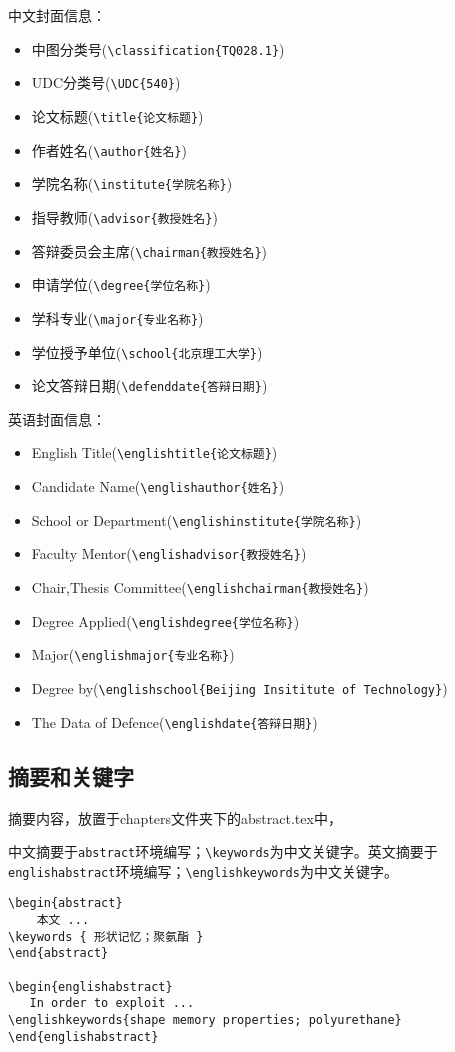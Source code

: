 中文封面信息：
\begin{itemize}
\item 中图分类号(\verb|\classification{TQ028.1}|)
\item UDC分类号(\verb|\UDC{540}|)
\item 论文标题(\verb|\title{论文标题}|)
\item 作者姓名(\verb|\author{姓名}|)
\item 学院名称(\verb|\institute{学院名称}|)
\item 指导教师(\verb|\advisor{教授姓名}|)
\item 答辩委员会主席(\verb|\chairman{教授姓名}|)
\item 申请学位(\verb|\degree{学位名称}|)
\item 学科专业(\verb|\major{专业名称}|)
\item 学位授予单位(\verb|\school{北京理工大学}|)
\item 论文答辩日期(\verb|\defenddate{答辩日期}|)
\end{itemize}


英语封面信息：
\begin{itemize}
\item English Title(\verb|\englishtitle{论文标题}|)
\item Candidate Name(\verb|\englishauthor{姓名}|)
\item School or Department(\verb|\englishinstitute{学院名称}|)
\item Faculty Mentor(\verb|\englishadvisor{教授姓名}|)
\item Chair,Thesis Committee(\verb|\englishchairman{教授姓名}|)
\item Degree Applied(\verb|\englishdegree{学位名称}|)
\item Major(\verb|\englishmajor{专业名称}|)
\item Degree by(\verb|\englishschool{Beijing Insititute of Technology}|)
\item The Data of Defence(\verb|\englishdate{答辩日期}|)
\end{itemize}

\subsection{摘要和关键字}
摘要内容，放置于chapters文件夹下的abstract.tex中，

中文摘要于\verb|abstract|环境编写；\verb|\keywords|为中文关键字。英文摘要于\verb|englishabstract|环境编写；\verb|\englishkeywords|为中文关键字。

\begin{lstlisting}[language={[LaTeX]TeX}, caption={ 中英文摘要 }]
\begin{abstract}
	本文 ...
\keywords { 形状记忆；聚氨酯 }
\end{abstract}

\begin{englishabstract}
   In order to exploit ...
\englishkeywords{shape memory properties; polyurethane}
\end{englishabstract}
\end{lstlisting}


